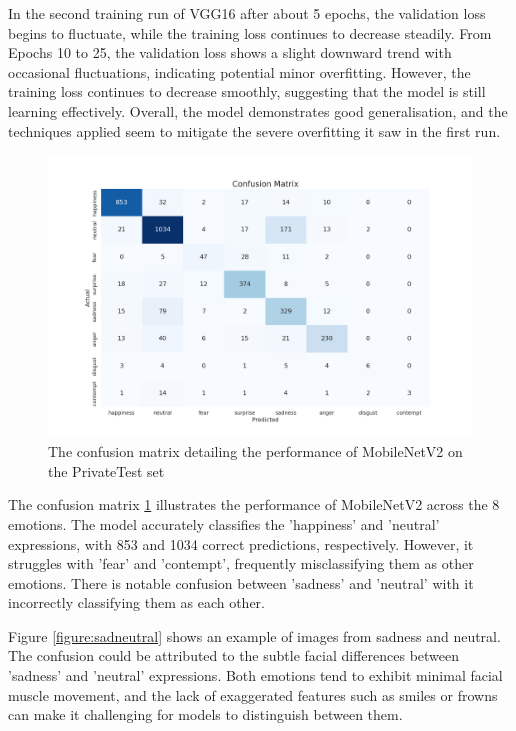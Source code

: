 In the second training run of VGG16 after about 5 epochs, the validation loss begins to fluctuate, while the training loss continues to decrease steadily. From Epochs 10 to 25, the validation loss shows a slight downward trend with occasional fluctuations, indicating potential minor overfitting. However, the training loss continues to decrease smoothly, suggesting that the model is still learning effectively. Overall, the model demonstrates good generalisation, and the techniques applied seem to mitigate the severe overfitting it saw in the first run.

\begin{figure}[H]
    \centering 
    \includegraphics[scale=0.38]{fed_images/conf_matrix_MobileNetv2.png}
    \caption{The confusion matrix detailing the performance of MobileNetV2 on the PrivateTest set}
    \label{figure:conf_mnv2}
\end{figure}

The confusion matrix \ref{figure:conf_mnv2} illustrates the performance of MobileNetV2 across the 8 emotions. The model accurately classifies the 'happiness' and 'neutral' expressions, with 853 and 1034 correct predictions, respectively. However, it struggles with 'fear' and 'contempt', frequently misclassifying them as other emotions. There is notable confusion between 'sadness' and 'neutral' with it incorrectly classifying them as each other. 

Figure \ref{figure:sadneutral} shows an example of images from sadness and neutral. The confusion could be attributed to the subtle facial differences between 'sadness' and 'neutral' expressions. Both emotions tend to exhibit minimal facial muscle movement, and the lack of exaggerated features such as smiles or frowns can make it challenging for models to distinguish between them.

